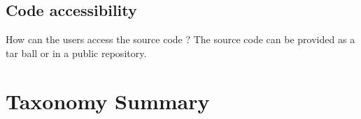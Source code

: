 \subsection{Code accessibility}
How can the users access the source code ?
The source code can be provided as a tar ball or in a public repository.


\section{Taxonomy Summary}

